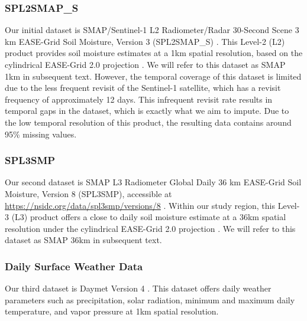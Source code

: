 \documentclass[review]{elsarticle}
\begin{document}
\subsubsection*{SPL2SMAP\_S}
Our initial dataset is SMAP/Sentinel-1 L2 Radiometer/Radar 30-Second Scene 3 km EASE-Grid Soil Moisture, Version 3 (SPL2SMAP\_S) \citep{das2019smap}. This Level-2 (L2) product provides soil moisture estimates at a 1km spatial resolution, based on the cylindrical EASE-Grid 2.0 projection \citep{brodzik2012ease}. We will refer to this dataset as SMAP 1km in subsequent text. However, the temporal coverage of this dataset is limited due to the less frequent revisit of the Sentinel-1 satellite, which has a revisit frequency of approximately 12 days. This infrequent revisit rate results in temporal gaps in the dataset, which is exactly what we aim to impute. Due to the low temporal resolution of this product, the resulting data contains around 95\% missing values.

\subsubsection*{SPL3SMP}
Our second dataset is SMAP L3 Radiometer Global Daily 36 km EASE-Grid Soil Moisture, Version 8 (SPL3SMP), accessible at \url{https://nsidc.org/data/spl3smp/versions/8} \citep{o2021smap}. Within our study region, this Level-3 (L3) product offers a close to daily soil moisture estimate at a 36km spatial resolution under the cylindrical EASE-Grid 2.0 projection \citep{brodzik2012ease}. We will refer to this dataset as SMAP 36km in subsequent text.



\subsubsection*{Daily Surface Weather Data}
Our third dataset is Daymet Version 4 \citep{thornton1840daymet}. This dataset offers daily weather parameters such as precipitation, solar radiation, minimum and maximum daily temperature, and vapor pressure at 1km spatial resolution. 
\end{document}
